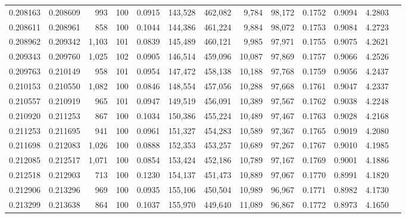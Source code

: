 \begin{tabular}{rrrrrrrrrrrrr}
0.208163 & 0.208609 &   993 & 100 &                                     0.0915 & 143,528 & 462,082 &   9,784 &  98,172 & 0.1752 & 0.9094 & 4.2803 \\
0.208611 & 0.208961 &   858 & 100 &                                     0.1044 & 144,386 & 461,224 &   9,884 &  98,072 & 0.1753 & 0.9084 & 4.2723 \\
0.208962 & 0.209342 & 1,103 & 101 &                                     0.0839 & 145,489 & 460,121 &   9,985 &  97,971 & 0.1755 & 0.9075 & 4.2621 \\
0.209343 & 0.209760 & 1,025 & 102 &                                     0.0905 & 146,514 & 459,096 &  10,087 &  97,869 & 0.1757 & 0.9066 & 4.2526 \\
0.209763 & 0.210149 &   958 & 101 &                                     0.0954 & 147,472 & 458,138 &  10,188 &  97,768 & 0.1759 & 0.9056 & 4.2437 \\
0.210153 & 0.210550 & 1,082 & 100 &                                     0.0846 & 148,554 & 457,056 &  10,288 &  97,668 & 0.1761 & 0.9047 & 4.2337 \\
0.210557 & 0.210919 &   965 & 101 &                                     0.0947 & 149,519 & 456,091 &  10,389 &  97,567 & 0.1762 & 0.9038 & 4.2248 \\
0.210920 & 0.211253 &   867 & 100 &                                     0.1034 & 150,386 & 455,224 &  10,489 &  97,467 & 0.1763 & 0.9028 & 4.2168 \\
0.211253 & 0.211695 &   941 & 100 &                                     0.0961 & 151,327 & 454,283 &  10,589 &  97,367 & 0.1765 & 0.9019 & 4.2080 \\
0.211698 & 0.212083 & 1,026 & 100 &                                     0.0888 & 152,353 & 453,257 &  10,689 &  97,267 & 0.1767 & 0.9010 & 4.1985 \\
0.212085 & 0.212517 & 1,071 & 100 &                                     0.0854 & 153,424 & 452,186 &  10,789 &  97,167 & 0.1769 & 0.9001 & 4.1886 \\
0.212518 & 0.212903 &   713 & 100 &                                     0.1230 & 154,137 & 451,473 &  10,889 &  97,067 & 0.1770 & 0.8991 & 4.1820 \\
0.212906 & 0.213296 &   969 & 100 &                                     0.0935 & 155,106 & 450,504 &  10,989 &  96,967 & 0.1771 & 0.8982 & 4.1730 \\
0.213299 & 0.213638 &   864 & 100 &                                     0.1037 & 155,970 & 449,640 &  11,089 &  96,867 & 0.1772 & 0.8973 & 4.1650 \\

\end{tabular}
